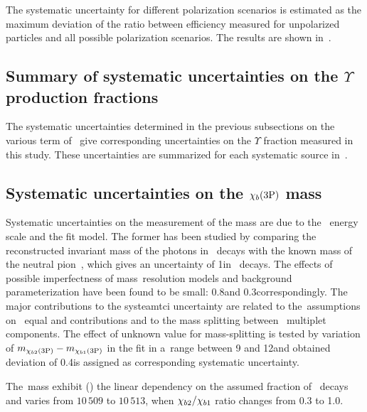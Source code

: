 



The systematic uncertainty for different polarization scenarios is estimated
as the maximum deviation of the ratio between efficiency measured for unpolarized
particles and all possible polarization scenarios. The results  are
shown in~.



\subsection{Summary of systematic uncertainties on the $\Upsilon$ production fractions} 



The systematic uncertainties determined in
the previous subsections on the various term of~ give
corresponding uncertainties on the $\Upsilon$ fraction measured in this
study. These uncertainties are summarized for each systematic source
in~. 



\subsection{Systematic uncertainties on the $\chi_{b}\mathrm{(3P)}$ mass} 





Systematic uncertainties on the measurement of the 
\chiboneThreeP mass are due to the \ecal~energy scale and the fit model.
The former has been studied by comparing the reconstructed invariant mass of the photons 
in \decay{\piz}{\g\g}~decays with the known mass of the neutral pion~\cite{Kali,Dasha_disser,CalibPET,*CalibMSU},  
which gives an uncertainty of 1\mevcc in ~decays.
The effects of possible imperfectness of mass~resolution models
and background parameterization  have been found to be small:
0.8\mevcc and 0.3\mevcc correspondingly.
The major contributions to the systeamtci uncertainty 
are related to the~assumptions on ~equal \chibone and \chibtwo contributions
and to the mass splitting  between \chib~multiplet components.
%
The effect of unknown value for mass-splitting
is tested by variation of
$m_{\chi_{b 2}\mathrm{(3P)}}-m_{\chi_{b 1}\mathrm{(3P)}}$ in the fit
in a~range between  9 and 12\mevcc and
obtained deviation of 0.4\mevcc is
assigned as corresponding systematic uncertainty.


%
The~\chiboneThreeP mass exhibit () the linear dependency on the assumed
fraction of \chibone~decays and varies from $10\,509$ to $10\,513$\mevc,
when $\chi_{b 2}/\chi_{b 1}$ ratio changes from 0.3 to 1.0.







